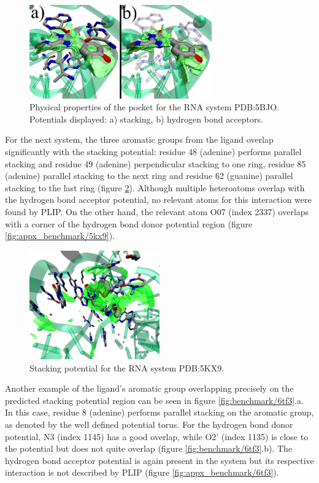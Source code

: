     \begin{figure}[H]
      \centering
      \includegraphics[width=0.7\textwidth]{figures/results/benchmark_rna/5bjo.png}
      \caption{\label{fig:benchmark/5bjo} Physical properties of the pocket for the RNA system PDB:5BJO. Potentials displayed: a) stacking, b) hydrogen bond acceptors.}
    \end{figure}

    For the next system, the three aromatic groups from the ligand overlap significantly with the stacking potential: residue 48 (adenine) performs parallel stacking and residue 49 (adenine) perpendicular stacking to one ring, residue 85 (adenine) parallel stacking to the next ring and residue 62 (guanine) parallel stacking to the last ring (figure \ref{fig:benchmark/5kx9}). Although multiple heteroatoms overlap with the hydrogen bond acceptor potential, no relevant atoms for this interaction were found by PLIP. On the other hand, the relevant atom O07 (index 2337) overlaps with a corner of the hydrogen bond donor potential region (figure \ref{fig:appx_benchmark/5kx9}).

    \begin{figure}[H]
      \centering
      \includegraphics[width=0.5\textwidth]{figures/results/benchmark_rna/5kx9.png}
      \caption{\label{fig:benchmark/5kx9} Stacking potential for the RNA system PDB:5KX9.}
    \end{figure}

    Another example of the ligand's aromatic group overlapping precisely on the predicted stacking potential region can be seen in figure \ref{fig:benchmark/6tf3}.a. In this case, residue 8 (adenine) performs parallel stacking on the aromatic group, as denoted by the well defined potential torus. For the hydrogen bond donor potential, N3 (index 1145) has a good overlap, while O2' (index 1135) is close to the potential but does not quite overlap (figure \ref{fig:benchmark/6tf3}.b). The hydrogen bond acceptor potential is again present in the system but its respective interaction is not described by PLIP (figure \ref{fig:appx_benchmark/6tf3}).

